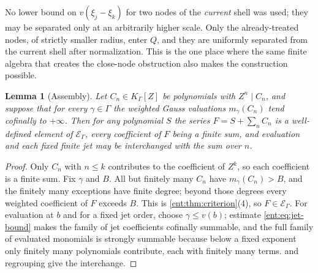 \documentclass[11pt]{article}
\theoremstyle{plain}
\newtheorem{lemma}[lemma]{Lemma}
\theoremstyle{plain}
\theoremstyle{plain}
\theoremstyle{definition}
\theoremstyle{definition}
\theoremstyle{definition}
\theoremstyle{definition}
\theoremstyle{remark}
\newcommand{\K}{K_\Gamma}\newcommand{\KD}{K_\Delta}
\newcommand{\E}{\mathcal E_\Gamma}
\begin{document}
No lower bound on $v(\xi_j-\xi_k)$ for two nodes of the \emph{current} shell
was used; they may be separated only at an arbitrarily higher scale. Only the
already-treated nodes, of strictly smaller radius, enter $Q$, and they are
uniformly separated from the current shell after normalization. This is the
one place where the same finite algebra that creates the close-node
obstruction also makes the construction possible.

\begin{lemma}[Assembly]\label{ent:lem:assembly}
Let $C_n\in\K[Z]$ be polynomials with $Z^n\mid C_n$, and suppose that for
every $\gamma\in\Gamma$ the weighted Gauss valuations $m_\gamma(C_n)$ tend
cofinally to $+\infty$. Then for any polynomial $S$ the series
$F=S+\sum_nC_n$ is a well-defined element of $\E$, every coefficient of $F$
being a finite sum, and evaluation and each fixed finite jet may be
interchanged with the sum over $n$.
\end{lemma}
\begin{proof}
Only $C_n$ with $n\le k$ contributes to the coefficient of $Z^k$, so each
coefficient is a finite sum. Fix $\gamma$ and $B$. All but finitely many
$C_n$ have $m_\gamma(C_n)>B$, and the finitely many exceptions have finite
degree; beyond those degrees every weighted coefficient of $F$ exceeds $B$.
This is \cref{ent:thm:criterion}(4), so $F\in\E$. For evaluation at $b$ and
for a fixed jet order, choose $\gamma\le v(b)$; estimate
\eqref{ent:eq:jet-bound} makes the family of jet coefficients cofinally
summable, and the full family of evaluated monomials is strongly summable
because below a fixed exponent only finitely many polynomials contribute,
each with finitely many terms.  and regrouping
give the interchange.
\end{proof}
\end{document}

